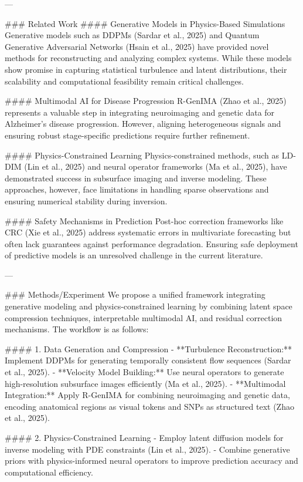 ---

### Related Work  
#### Generative Models in Physics-Based Simulations  
Generative models such as DDPMs (Sardar et al., 2025) and Quantum Generative Adversarial Networks (Hsain et al., 2025) have provided novel methods for reconstructing and analyzing complex systems. While these models show promise in capturing statistical turbulence and latent distributions, their scalability and computational feasibility remain critical challenges.

#### Multimodal AI for Disease Progression  
R-GenIMA (Zhao et al., 2025) represents a valuable step in integrating neuroimaging and genetic data for Alzheimer's disease progression. However, aligning heterogeneous signals and ensuring robust stage-specific predictions require further refinement.

#### Physics-Constrained Learning  
Physics-constrained methods, such as LD-DIM (Lin et al., 2025) and neural operator frameworks (Ma et al., 2025), have demonstrated success in subsurface imaging and inverse modeling. These approaches, however, face limitations in handling sparse observations and ensuring numerical stability during inversion.

#### Safety Mechanisms in Prediction  
Post-hoc correction frameworks like CRC (Xie et al., 2025) address systematic errors in multivariate forecasting but often lack guarantees against performance degradation. Ensuring safe deployment of predictive models is an unresolved challenge in the current literature.

---

### Methods/Experiment  
We propose a unified framework integrating generative modeling and physics-constrained learning by combining latent space compression techniques, interpretable multimodal AI, and residual correction mechanisms. The workflow is as follows:

#### 1. Data Generation and Compression  
- **Turbulence Reconstruction:** Implement DDPMs for generating temporally consistent flow sequences (Sardar et al., 2025).  
- **Velocity Model Building:** Use neural operators to generate high-resolution subsurface images efficiently (Ma et al., 2025).  
- **Multimodal Integration:** Apply R-GenIMA for combining neuroimaging and genetic data, encoding anatomical regions as visual tokens and SNPs as structured text (Zhao et al., 2025).  

#### 2. Physics-Constrained Learning  
- Employ latent diffusion models for inverse modeling with PDE constraints (Lin et al., 2025).  
- Combine generative priors with physics-informed neural operators to improve prediction accuracy and computational efficiency.  

